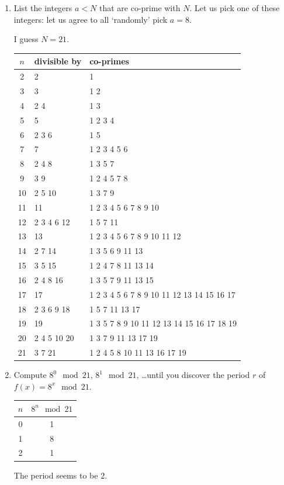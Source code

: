 \documentclass[12pt]{article}
\newenvironment{answer}{\begingroup\setlength{\leftskip}{-\leftmargin}\begin{framed}}{\end{framed}\endgroup}
\begin{document}
\begin{enumerate}
    \item List the integers $a < N$ that are co-prime with $N$. Let us pick one of these integers: let us agree to all `randomly' pick $a = 8$.

    \begin{answer}
        I guess $N = 21$.
        \begin{tabular}{c|l|l}
            $n$ & divisible by & co-primes\\
            \hline
            2 & 2 & 1 \\
            3 & 3 & 1 2 \\
            4 & 2 4 & 1 3 \\
            5 & 5 & 1 2 3 4 \\
            6 & 2 3 6 & 1 5 \\
            7 & 7 & 1 2 3 4 5 6 \\
            8 & 2 4 8 & 1 3 5 7 \\
            9 & 3 9 & 1 2 4 5 7 8 \\
            10 & 2 5 10 & 1 3 7 9 \\
            11 & 11 & 1 2 3 4 5 6 7 8 9 10 \\
            12 & 2 3 4 6 12 & 1 5 7 11 \\
            13 & 13 & 1 2 3 4 5 6 7 8 9 10 11 12 \\
            14 & 2 7 14 & 1 3 5 6 9 11 13 \\
            15 & 3 5 15 & 1 2 4 7 8 11 13 14 \\
            16 & 2 4 8 16 & 1 3 5 7 9 11 13 15 \\
            17 & 17 & 1 2 3 4 5 6 7 8 9 10 11 12 13 14 15 16 17 \\
            18 & 2 3 6 9 18 & 1 5 7 11 13 17 \\
            19 & 19 & 1 3 5 7 8 9 10 11 12 13 14 15 16 17 18 19 \\
            20 & 2 4 5 10 20 & 1 3 7 9 11 13 17 19 \\
            21 & 3 7 21 & 1 2 4 5 8 10 11 13 16 17 19 \\
        \end{tabular}
    \end{answer}

    \item Compute $8^0 \mod 21$, $8^1 \mod 21$, \ldots until you discover the period $r$ of $f(x) = 8^x \mod 21$.

    \begin{answer}
        \begin{tabular}{c|c}
            $n$ & $8^n \mod 21$ \\
            \hline
            0 & 1 \\
            1 & 8 \\
            2 & 1 \\
        \end{tabular}
        The period seems to be $2$.
    \end{answer}


\end{enumerate}
\end{document}
